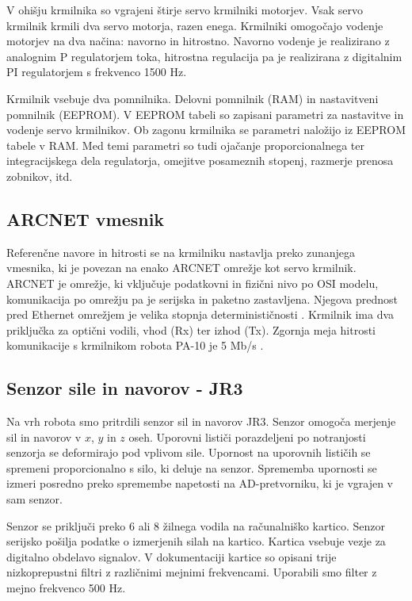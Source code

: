 \documentclass[a4paper]{article}
\begin{document}
V ohišju krmilnika so vgrajeni štirje servo krmilniki motorjev. Vsak servo krmilnik krmili dva servo motorja, razen enega. Krmilniki omogočajo vodenje motorjev na dva načina: navorno in hitrostno. Navorno vodenje je realizirano z analognim P regulatorjem toka, hitrostna regulacija pa je realizirana z digitalnim PI regulatorjem s frekvenco 1500 Hz.

Krmilnik vsebuje dva pomnilnika. Delovni pomnilnik (RAM) in nastavitveni pomnilnik (EEPROM). V EEPROM tabeli so zapisani parametri za nastavitve in vodenje servo krmilnikov. Ob zagonu krmilnika se parametri naložijo iz EEPROM tabele v RAM. Med temi parametri so tudi ojačanje proporcionalnega ter integracijskega dela regulatorja, omejitve posameznih stopenj, razmerje prenosa zobnikov, itd.

\subsection{ARCNET vmesnik}\label{sec:arc_drive}

Referenčne navore in hitrosti se na krmilniku nastavlja preko zunanjega vmesnika, ki je povezan na enako ARCNET omrežje kot servo krmilnik. ARCNET je omrežje, ki vključuje podatkovni in fizični nivo po OSI modelu, komunikacija po omrežju pa je serijska in paketno zastavljena. Njegova prednost pred Ethernet omrežjem je velika stopnja determinističnosti \cite{arc_tutorial}. Krmilnik ima dva priključka za optični 
vodili, vhod (Rx) ter izhod (Tx). Zgornja meja hitrosti komunikacije s krmilnikom robota PA-10 je 5 Mb/s \cite{pa10-manual}.

\subsection{Senzor sile in navorov - JR3}	

Na vrh robota smo pritrdili senzor sil in navorov JR3. Senzor omogoča merjenje sil in navorov v $x$, $y$ in $z$ oseh. Uporovni lističi porazdeljeni po notranjosti senzorja se deformirajo pod vplivom sile. Upornost na uporovnih lističih se spremeni proporcionalno s silo, ki deluje na senzor. Sprememba upornosti se izmeri posredno preko spreme\-mbe napetosti na AD-pretvorniku, ki je vgrajen v sam senzor. 

Senzor se priključi preko 6 ali 8 žilnega vodila na računalniško kartico. Senzor serijsko pošilja podatke o izmerjenih silah na kartico. Kartica vsebuje vezje za digitalno obdelavo signalov. V dokumentaciji kartice \cite{jr3_doc_inst} so opisani trije nizkoprepustni filtri z različnimi mejnimi frekvencami. Uporabili smo filter z mejno frekvenco 500 Hz.
\end{document}
